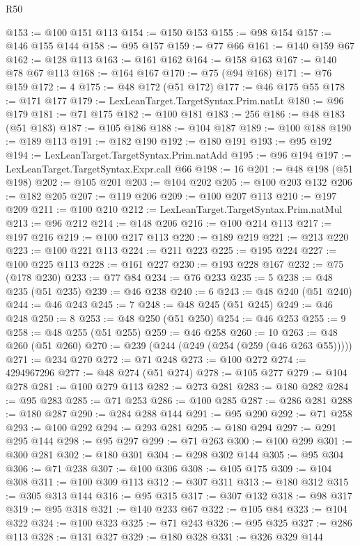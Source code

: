 \begin{lexlean}{R50}
\begin{coremodule}
@153 := @100 @151 @113
@154 := @150 @153
@155 := @98 @154
@157 := @146 @155 @144
@158 := @95 @157
@159 := @77 @66
@161 := @140 @159 @67
@162 := @128 @113
@163 := @161 @162
@164 := @158 @163
@167 := @140 @78 @67 @113
@168 := @164 @167
@170 := @75 (@94 @168)
@171 := @76 @159
@172 := 4
@175 := @48 @172 (@51 @172)
@177 := @46 @175 @55
@178 := @171 @177
@179 := LexLeanTarget.TargetSyntax.Prim.natLt
@180 := @96 @179
@181 := @71 @175
@182 := @100 @181
@183 := 256
@186 := @48 @183 (@51 @183)
@187 := @105 @186
@188 := @104 @187
@189 := @100 @188
@190 := @189 @113
@191 := @182 @190
@192 := @180 @191
@193 := @95 @192
@194 := LexLeanTarget.TargetSyntax.Prim.natAdd
@195 := @96 @194
@197 := LexLeanTarget.TargetSyntax.Expr.call @66
@198 := 16
@201 := @48 @198 (@51 @198)
@202 := @105 @201
@203 := @104 @202
@205 := @100 @203 @132
@206 := @182 @205
@207 := @119 @206
@209 := @100 @207 @113
@210 := @197 @209
@211 := @100 @210
@212 := LexLeanTarget.TargetSyntax.Prim.natMul
@213 := @96 @212
@214 := @148 @206
@216 := @100 @214 @113
@217 := @197 @216
@219 := @100 @217 @113
@220 := @189 @219
@221 := @213 @220
@223 := @100 @221 @113
@224 := @211 @223
@225 := @195 @224
@227 := @100 @225 @113
@228 := @161 @227
@230 := @193 @228 @167
@232 := @75 (@178 @230)
@233 := @77 @84
@234 := @76 @233
@235 := 5
@238 := @48 @235 (@51 @235)
@239 := @46 @238
@240 := 6
@243 := @48 @240 (@51 @240)
@244 := @46 @243
@245 := 7
@248 := @48 @245 (@51 @245)
@249 := @46 @248
@250 := 8
@253 := @48 @250 (@51 @250)
@254 := @46 @253
@255 := 9
@258 := @48 @255 (@51 @255)
@259 := @46 @258
@260 := 10
@263 := @48 @260 (@51 @260)
@270 := @239 (@244 (@249 (@254 (@259 (@46 @263 @55)))))
@271 := @234 @270
@272 := @71 @248
@273 := @100 @272
@274 := 4294967296
@277 := @48 @274 (@51 @274)
@278 := @105 @277
@279 := @104 @278
@281 := @100 @279 @113
@282 := @273 @281
@283 := @180 @282
@284 := @95 @283
@285 := @71 @253
@286 := @100 @285
@287 := @286 @281
@288 := @180 @287
@290 := @284 @288 @144
@291 := @95 @290
@292 := @71 @258
@293 := @100 @292
@294 := @293 @281
@295 := @180 @294
@297 := @291 @295 @144
@298 := @95 @297
@299 := @71 @263
@300 := @100 @299
@301 := @300 @281
@302 := @180 @301
@304 := @298 @302 @144
@305 := @95 @304
@306 := @71 @238
@307 := @100 @306
@308 := @105 @175
@309 := @104 @308
@311 := @100 @309 @113
@312 := @307 @311
@313 := @180 @312
@315 := @305 @313 @144
@316 := @95 @315
@317 := @307 @132
@318 := @98 @317
@319 := @95 @318
@321 := @140 @233 @67
@322 := @105 @84
@323 := @104 @322
@324 := @100 @323
@325 := @71 @243
@326 := @95 @325
@327 := @286 @113
@328 := @131 @327
@329 := @180 @328
@331 := @326 @329 @144

\end{coremodule}
\end{lexlean}
